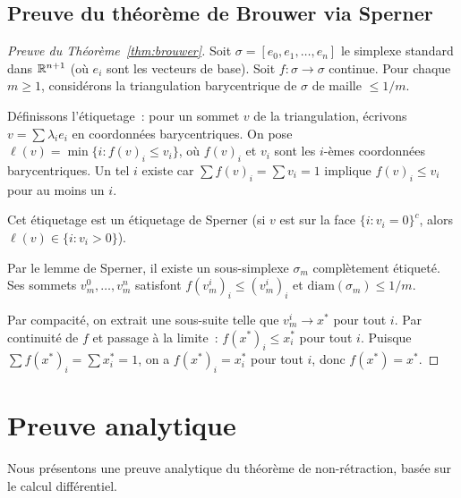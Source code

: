 \subsection{Preuve du th\'eor\`eme de Brouwer via Sperner}

\begin{proof}[Preuve du Th\'eor\`eme~\ref{thm:brouwer}]
Soit $\sigma = [e_0, e_1, \ldots, e_n]$ le simplexe standard dans $\mathbb{R}^{n+1}$
(o\`u $e_i$ sont les vecteurs de base). Soit $f : \sigma \to \sigma$ continue.
Pour chaque $m \geq 1$, consid\'erons la triangulation barycentrique de $\sigma$
de maille $\leq 1/m$.

D\'efinissons l'\'etiquetage~: pour un sommet $v$ de la triangulation, \'ecrivons
$v = \sum \lambda_i e_i$ en coordonn\'ees barycentriques. On pose
$\ell(v) = \min\{i : f(v)_i \leq v_i\}$, o\`u $f(v)_i$ et $v_i$ sont les
$i$-\`emes coordonn\'ees barycentriques. Un tel $i$ existe car
$\sum f(v)_i = \sum v_i = 1$ implique $f(v)_i \leq v_i$ pour au moins un $i$.

Cet \'etiquetage est un \'etiquetage de Sperner (si $v$ est sur la face
$\{i : v_i = 0\}^c$, alors $\ell(v) \in \{i : v_i > 0\}$).

Par le lemme de Sperner, il existe un sous-simplexe $\sigma_m$ compl\`etement
\'etiquet\'e. Ses sommets $v_m^0, \ldots, v_m^n$ satisfont
$f(v_m^i)_i \leq (v_m^i)_i$ et $\mathrm{diam}(\sigma_m) \leq 1/m$.

Par compacit\'e, on extrait une sous-suite telle que $v_m^i \to x^*$ pour tout
$i$. Par continuit\'e de $f$ et passage \`a la limite~: $f(x^*)_i \leq x^*_i$
pour tout $i$. Puisque $\sum f(x^*)_i = \sum x^*_i = 1$, on a
$f(x^*)_i = x^*_i$ pour tout $i$, donc $f(x^*) = x^*$.
\end{proof}

\section{Preuve analytique}

Nous pr\'esentons une preuve analytique du th\'eor\`eme de non-r\'etraction, bas\'ee
sur le calcul diff\'erentiel.

